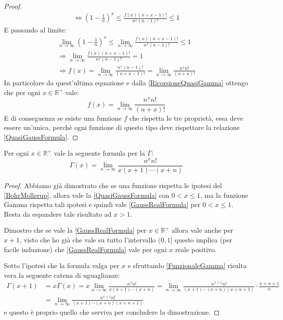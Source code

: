 \begin{proof}
\begin{gather*}
		\iff \left(1-\frac{1}{n}\right)^x \le  \frac{f(x)(n+x-1)!}{n^x(n-1)!} \le 1
	\end{gather*}
	E passando al limite:
	\begin{gather*}
		\lim_{n\to \infty} \left(1-\frac{1}{n}\right)^x \le \lim_{n\to \infty}  \frac{f(x)(n+x-1)!}{n^x(n-1)!} \le 1 \\
		\Longrightarrow \lim_{n\to \infty} \frac{f(x)(n+x-1)!}{n^x(n-1)!}  = 1 \\
		\Longrightarrow f(x) = \lim_{n\to \infty} \frac{n^x(n-1)!}{(n+x-1)!}=\lim_{n\to \infty} \frac{n^xn!}{(n+x)!}
	\end{gather*}
	In particolare da quest'ultima equazione e dalla \cref{RicorsioneQuasiGamma} ottengo che per ogni $x\in\mathbb{R}^+$ vale:
	\begin{equation}\label{QuasiGaussFormula}
		f(x)=\lim_{n\to \infty} \frac{n^xn!}{(n+x)!}
	\end{equation}
	E di conseguenza se esiste una funzione $f$ che rispetta le tre proprietà, essa deve essere un'unica, perchè ogni
	funzione di questo tipo deve rispettare la relazione \cref{QuasiGaussFormula}.
\end{proof}
 
\begin{corollary}\label{GaussFormula}
	Per ogni $x\in\mathbb{R^+}$ vale la seguente formula per la $\Gamma$:
\begin{equation}\label{GaussRealFormula}
	\Gamma(x)=\lim_{n\to \infty} \frac{n^xn!}{x(x+1)\cdots(x+n)}
\end{equation}
\end{corollary}
\begin{proof}
	Abbiamo già dimostrato che se una funzione rispetta le ipotesi del \cref{BohrMollerup}, allora vale la 
	\cref{QuasiGaussFormula} con $0<x\le 1$, ma la funzione Gamma rispetta tali ipotesi e quindi vale \cref{GaussRealFormula}
	per $0<x\le 1$.
	Resta da espandere tale risultato ad $x>1$.
	
	Dimostro che se vale la \cref{GaussRealFormula} per $x\in\mathbb{R^+}$ allora vale anche per $x+1$, visto che ho già che vale
	su tutto l'intervallo $(0,1]$ questo implica (per facile induzione) che \cref{GaussRealFormula} vale per ogni $x$ reale positivo.
	
	Sotto l'ipotesi che la formula valga per $x$ e sfruttando \cref{FunzionaleGamma} risulta vera la seguente catena di uguaglianze:
	\begin{equation*}\begin{split}
		\Gamma(x+1) & =x\Gamma(x)=x\lim_{n\to \infty} \frac{n^xn!}{x(x+1)\cdots(x+n)} = 
		\lim_{n\to \infty} \frac{n^{x+1}n!}{(x+1)\cdots(x+n)(x+n+1)}\cdot\frac{x+n+1}{n}\\
		& = \lim_{n\to \infty} \frac{n^{x+1}n!}{(x+1)\cdots(x+n)(x+n+1)}
	\end{split}\end{equation*}
	e questo è proprio quello che serviva per concludere la dimostrazione.
\end{proof}

